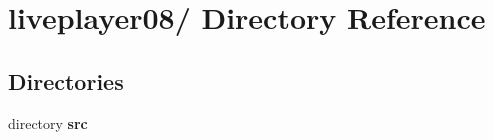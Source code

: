 \section{liveplayer08/ Directory Reference}
\label{dir_6d3cd12205463692e09d9921dc995974}
\subsection*{Directories}
\begin{CompactItemize}
\item 
directory {\bf src}
\end{CompactItemize}
